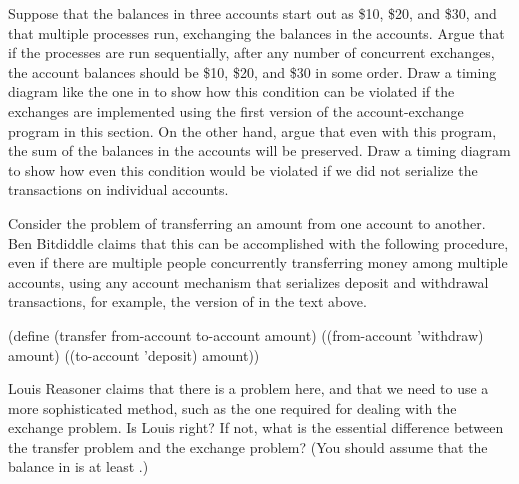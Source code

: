 \begin{exercise}
	\label{Exercise 3.43}
	Suppose that the balances in three accounts start out as \$10, \$20, and \$30, and that multiple processes run, exchanging the balances in the accounts.
	Argue that if the processes are run sequentially, after any number of concurrent exchanges, the account balances should be \$10, \$20, and \$30 in some order.
	Draw a timing diagram like the one in  to show how this condition can be violated if the exchanges are implemented using the first version of the account-exchange program in this section.
	On the other hand, argue that even with this  program, the sum of the balances in the accounts will be preserved.
	Draw a timing diagram to show how even this condition would be violated if we did not serialize the transactions on individual accounts.
\end{exercise}



\begin{exercise}
	\label{Exercise 3.44}
	Consider the problem of transferring an amount from one account to another.
	Ben Bitdiddle claims that this can be accomplished with the following procedure, even if there are multiple people concurrently transferring money among multiple accounts, using any account mechanism that serializes deposit and withdrawal transactions, for example, the version of  in the text above.
	\begin{scheme}
	  (define (transfer from-account to-account amount)
	    ((from-account 'withdraw) amount)
	    ((to-account 'deposit) amount))
	\end{scheme}
	Louis Reasoner claims that there is a problem here, and that we need to use a more sophisticated method, such as the one required for dealing with the exchange problem.
	Is Louis right?
	If not, what is the essential difference between the transfer problem and the exchange problem?
	(You should assume that the balance in  is at least .)
\end{exercise}



